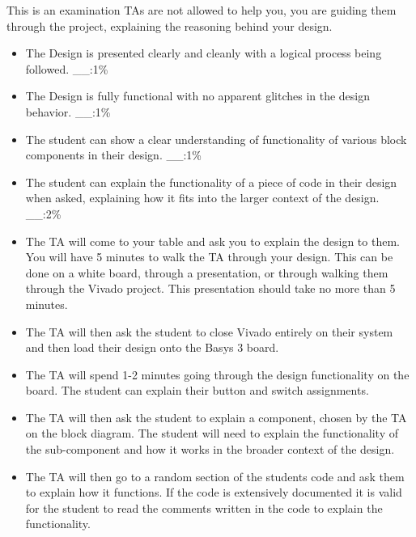 This is an examination TAs are not allowed to help you, you are guiding them through the project, explaining the reasoning behind your design. 

\begin{itemize}
    \item The Design is presented clearly and cleanly with a logical process being followed. \hspace{1cm} \_\_:1\%
    \item The Design is fully functional with no apparent glitches in the design behavior. \hspace{1cm} \_\_:1\%
    \item The student can show a clear understanding of functionality of various block components in their design. \hspace{1cm} \_\_:1\%
    \item The student can explain the functionality of a piece of code in their design when asked, explaining how it fits into the larger context of the design. \hspace{1cm} \_\_:2\%
\end{itemize}

\vspace{1cm}

\begin{itemize}
    \item The TA will come to your table and ask you to explain the design to them. You will have 5 minutes to walk the TA through your design. This can be done on a white board, through a presentation, or through walking them through the Vivado project. This presentation should take no more than 5 minutes.\\
    \item The TA will then ask the student to close Vivado entirely on their system and then load their design onto the Basys 3 board.
    \item The TA will spend 1-2 minutes going through the design functionality on the board. The student can explain their button and switch assignments.
    \item The TA will then ask the student to explain a component, chosen by the TA on the block diagram. The student will need to explain the functionality of the sub-component and how it works in the broader context of the design.
    \item The TA will then go to a random section of the students code and ask them to explain how it functions. If the code is extensively documented it is valid for the student to read the comments written in the code to explain the functionality. 
    
\end{itemize}

